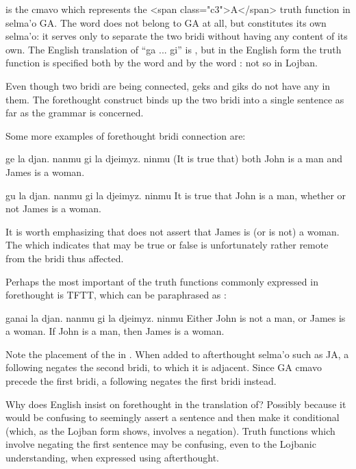  is the cmavo which represents the <span
    class="c3">A</span> truth function in selma'o GA. The word
     does not belong to GA at all, but constitutes its own
    selma'o: it serves only to separate the two bridi without
    having any content of its own. The English translation of ``ga
    ... gi'' is , but in the English form the
    truth function is specified both by the word  and by
    the word : not so in Lojban. 

Even though two bridi are being connected, geks and giks do
    not have any  in them. The forethought construct binds up
    the two bridi into a single sentence as far as the grammar is
    concerned.

Some more examples of forethought bridi connection are:
\begin{example}
ge la djan. nanmu gi la djeimyz. ninmu\n
(It is true that)\n
both John is a man and James is a woman.
\end{example}

\begin{example}
gu la djan. nanmu\n
\T	gi la djeimyz. ninmu\n
It is true that John is a man,\n
\T	whether or not James is a woman.
\end{example}

It is worth emphasizing that 
    does not assert that James is (or is not) a woman. The 
    which indicates that  may be true or false
    is unfortunately rather remote from the bridi thus
    affected.

Perhaps the most important of the truth functions commonly
    expressed in forethought is TFTT, which can be paraphrased as
    :
\begin{example}
ganai la djan. nanmu gi la djeimyz. ninmu\n
Either John is not a man, or James is a woman.\n
If John is a man, then James is a woman.
\end{example}

Note the placement of the  in . When added to afterthought selma'o such as JA, a
    following  negates the second bridi, to which it is
    adjacent. Since GA cmavo precede the first bridi, a following
     negates the first bridi instead. 

Why does English insist on forethought in the translation of? Possibly because it would be
    confusing to seemingly assert a sentence and then make it
    conditional (which, as the Lojban form shows, involves a
    negation). Truth functions which involve negating the first
    sentence may be confusing, even to the Lojbanic understanding,
    when expressed using afterthought.

